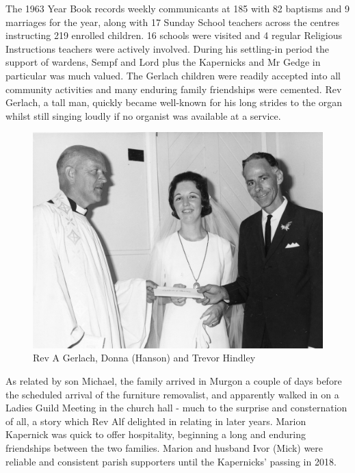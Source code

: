 The 1963 Year Book records weekly communicants at 185 with 82 baptisms and 9 marriages for the year, along with 17 Sunday School teachers across the centres instructing 219 enrolled children. 16 schools were visited and 4 regular Religious Instructions teachers were actively involved. During his settling-in period the support of wardens, Sempf and Lord plus the Kapernicks and Mr Gedge in particular was much valued. The Gerlach children were readily accepted into all community activities and many enduring family friendships were cemented. Rev Gerlach, a tall man, quickly became well-known for his long strides to the organ whilst still singing loudly if no organist was available at a service.









\begin{figure}
\begin{center}
\includegraphics[width=1.\linewidth,center]{../images/donnaVestry.jpg}
\caption{Rev A Gerlach, Donna (Hanson) and Trevor Hindley}
\end{center}
\end{figure}




As related by son Michael, the family arrived in Murgon a couple of days before the scheduled arrival of the furniture removalist, and apparently walked in on a Ladies Guild Meeting in the church hall - much to the surprise and consternation of all, a story which Rev Alf delighted in relating in later years. Marion Kapernick was quick to offer hospitality, beginning a long and enduring friendships between the two families. Marion and husband Ivor (Mick) were reliable and consistent parish supporters until the Kapernicks' passing in 2018.



